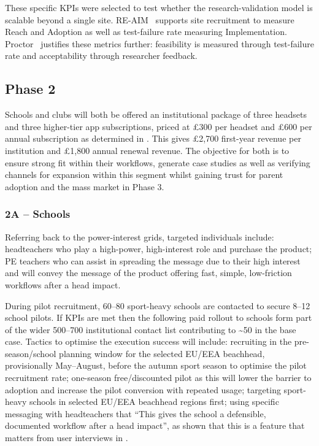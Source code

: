 These specific KPIs were selected to test whether the research-validation model is scalable beyond a single site. RE-AIM~\cite{reaim_framework} supports site recruitment to measure Reach and Adoption as well as test-failure rate measuring Implementation. Proctor~\cite{proctor2011implementation} justifies these metrics further: feasibility is measured through test-failure rate and acceptability through researcher feedback.

\subsection{Phase 2}

Schools and clubs will both be offered an institutional package of three headsets and three higher-tier app subscriptions, priced at \pounds{}300 per headset and \pounds{}600 per annual subscription as determined in . This gives \pounds{}2,700 first-year revenue per institution and \pounds{}1,800 annual renewal revenue. The objective for both is to ensure strong fit within their workflows, generate case studies as well as verifying channels for expansion within this segment whilst gaining trust for parent adoption and the mass market in Phase 3.

\subsubsection{2A -- Schools}

Referring back to the power-interest grids, targeted individuals include: headteachers who play a high-power, high-interest role and purchase the product; PE teachers who can assist in spreading the message due to their high interest and will convey the message of the product offering fast, simple, low-friction workflows after a head impact.

During pilot recruitment, 60--80 sport-heavy schools are contacted to secure 8--12 school pilots. If KPIs are met then the following paid rollout to schools form part of the wider 500--700 institutional contact list contributing to \textasciitilde{}50 in the base case. Tactics to optimise the execution success will include: recruiting in the pre-season/school planning window for the selected EU/EEA beachhead, provisionally May--August, before the autumn sport season to optimise the pilot recruitment rate; one-season free/discounted pilot as this will lower the barrier to adoption and increase the pilot conversion with repeated usage; targeting sport-heavy schools in selected EU/EEA beachhead regions first; using specific messaging with headteachers that ``This gives the school a defensible, documented workflow after a head impact'', as shown that this is a feature that matters from user interviews in .

